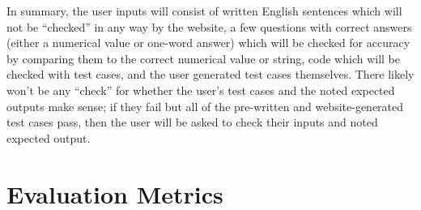 \documentclass[10pt,twocolumn]{article}
\begin{document}
In summary, the user inputs will consist of written English sentences which will not be “checked” in any way by the website, a few questions with correct answers (either a numerical value or one-word answer) which will be checked for accuracy by comparing them to the correct numerical value or string, code which will be checked with test cases, and the user generated test cases themselves. There likely won’t be any “check” for whether the user’s test cases and the noted expected outputs make sense; if they fail but all of the pre-written and website-generated test cases pass, then the user will be asked to check their inputs and noted expected output.

\section{Evaluation Metrics}
\end{document}
